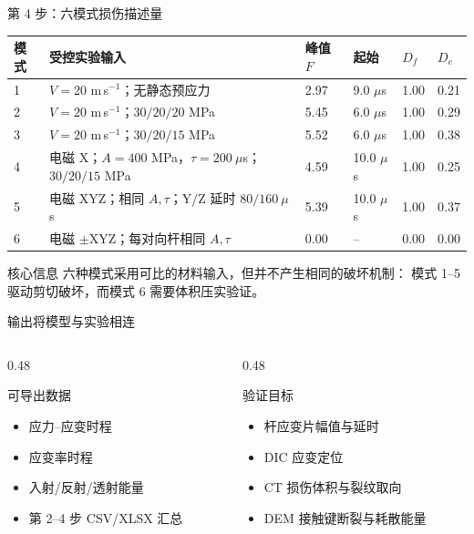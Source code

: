 \documentclass[11pt,aspectratio=169]{beamer}
\newcommand{\toprule}{\hline}
\newcommand{\midrule}{\hline}
\newcommand{\bottomrule}{\hline}
\begin{document}
\begin{frame}{第 4 步：六模式损伤描述量}
  \tiny
  \begin{tabular}{@{}p{}p{}p{}p{}p{}p{}@{}}
    \toprule
    \textbf{模式} & \textbf{受控实验输入} & \textbf{峰值 $F$} & \textbf{起始} & \textbf{$D_f$} & \textbf{$D_c$} \\
    \midrule
    1 & $V=20$ m\,s$^{-1}$；无静态预应力 & 2.97 & 9.0 $\mu$s & 1.00 & 0.21 \\
    2 & $V=20$ m\,s$^{-1}$；$30/20/20$ MPa & 5.45 & 6.0 $\mu$s & 1.00 & 0.29 \\
    3 & $V=20$ m\,s$^{-1}$；$30/20/15$ MPa & 5.52 & 6.0 $\mu$s & 1.00 & 0.38 \\
    4 & 电磁 X；$A=400$ MPa，$\tau=200~\mu$s；$30/20/15$ MPa & 4.59 & 10.0 $\mu$s & 1.00 & 0.25 \\
    5 & 电磁 XYZ；相同 $A,\tau$；Y/Z 延时 $80/160~\mu$s & 5.39 & 10.0 $\mu$s & 1.00 & 0.37 \\
    6 & 电磁 $\pm$XYZ；每对向杆相同 $A,\tau$ & 0.00 & -- & 0.00 & 0.00 \\
    \bottomrule
  \end{tabular}
  \vspace{0.22cm}
  \begin{block}{核心信息}
    六种模式采用可比的材料输入，但并不产生相同的破坏机制：
    模式 1--5 驱动剪切破坏，而模式 6 需要体积压实验证。
  \end{block}
\end{frame}

\begin{frame}{输出将模型与实验相连}
  \begin{columns}[T,onlytextwidth]
    \begin{column}{0.48\textwidth}
      \begin{exampleblock}{可导出数据}
        \begin{itemize}
          \item 应力--应变时程
          \item 应变率时程
          \item 入射/反射/透射能量
          \item 第 2--4 步 CSV/XLSX 汇总
        \end{itemize}
      \end{exampleblock}
    \end{column}
    \begin{column}{0.48\textwidth}
      \begin{block}{验证目标}
        \begin{itemize}
          \item 杆应变片幅值与延时
          \item DIC 应变定位
          \item CT 损伤体积与裂纹取向
          \item DEM 接触键断裂与耗散能量
        \end{itemize}
      \end{block}
    \end{column}
  \end{columns}
\end{frame}
\end{document}
